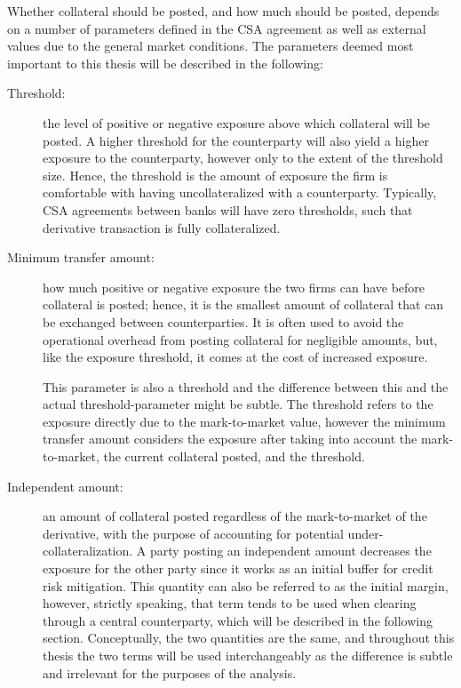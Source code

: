 \documentclass[main.tex]{subfiles}
\begin{document}
        Whether collateral should be posted, and how much should be posted, 
        depends on a number of parameters defined in the CSA agreement
        as well as external values due to the general market conditions.
        The parameters deemed most important to this thesis will be described in the following:
        \begin{description}
            \item[Threshold:] 
            the level of positive or negative exposure above which collateral will be posted. 
            A higher threshold for the counterparty will also yield a higher exposure to the counterparty,
            however only to the extent of the threshold size. 
            Hence, the threshold is the amount of exposure the firm is comfortable 
            with having uncollateralized with a counterparty.
            Typically, CSA agreements between banks will have zero thresholds, 
            such that derivative transaction is fully collateralized.
            
            \item[Minimum transfer amount:] 
            how much positive or negative exposure the two firms can have before collateral is posted;
            hence, it is the smallest amount of collateral that can be exchanged between counterparties.
            It is often used to avoid the operational overhead from posting collateral for negligible amounts,
            but, like the exposure threshold, it comes at the cost of increased exposure.

            This parameter is also a threshold and the difference between this
            and the actual threshold-parameter might be subtle.
            The threshold refers to the exposure directly due to the mark-to-market value,
            however the minimum transfer amount considers the exposure after taking into 
            account the mark-to-market, the current collateral posted, and the threshold.

            \item[Independent amount:]
            an amount of collateral posted regardless of the mark-to-market 
            of the derivative, with the purpose of accounting for potential under-collateralization.
            A party posting an independent amount decreases the exposure for the other party
            since it works as an initial buffer for credit risk mitigation.
            This quantity can also be referred to as the initial margin, however, strictly speaking, 
            that term tends to be used when clearing through a central counterparty,
            which will be described in the following section.
            Conceptually, the two quantities are the same, and throughout this thesis
            the two terms will be used interchangeably as the difference is subtle
            and irrelevant for the purposes of the analysis. 


\end{description}
\end{document}
